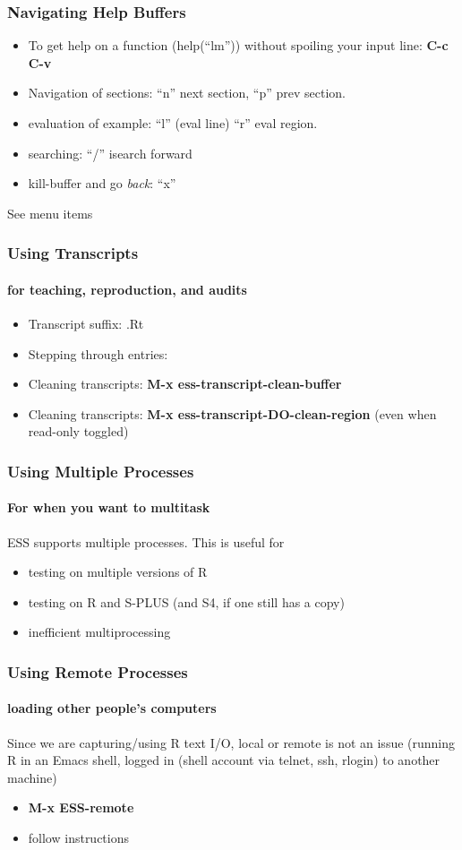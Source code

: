 \documentclass{beamer}
\begin{document}
\begin{frame}
  \frametitle{Navigating Help Buffers}
  \begin{itemize}
  \item To get help on a function (help(``lm'')) without
    spoiling your input line:  \textbf{C-c C-v}
  \item Navigation of sections: ``n'' next section, ``p'' prev section.
  \item evaluation of example: ``l'' (eval line) ``r'' eval region.
  \item searching: ``/'' isearch forward
  \item kill-buffer and go \textit{back}: ``x''
  \end{itemize}
  See menu items
\end{frame}

\begin{frame}
  \frametitle{Using Transcripts}
  \framesubtitle{for teaching, reproduction, and audits}
  \begin{itemize}
  \item Transcript suffix:  .Rt
  \item Stepping through entries:
  \item Cleaning transcripts: \textbf{M-x ess-transcript-clean-buffer}
  \item Cleaning transcripts: \textbf{M-x ess-transcript-DO-clean-region} (even when read-only toggled)
  \end{itemize}
\end{frame}

\begin{frame}
  \frametitle{Using Multiple Processes}
  \framesubtitle{For when you want to multitask}
  ESS supports multiple processes.   This is useful for 
  \begin{itemize}
  \item testing on multiple versions of R
  \item testing on R and S-PLUS (and S4, if one still has a copy)
  \item inefficient multiprocessing
  \end{itemize}
\end{frame}

\begin{frame}
  \frametitle{Using Remote Processes}
  \framesubtitle{loading other people's computers}
  Since we are capturing/using R text I/O, local or remote is not an
  issue (running R in an Emacs shell, logged in (shell account via
  telnet, ssh, rlogin) to another machine)
  \begin{itemize}
  \item \textbf{M-x ESS-remote}
  \item follow instructions
  \end{itemize}
\end{frame}
\end{document}
